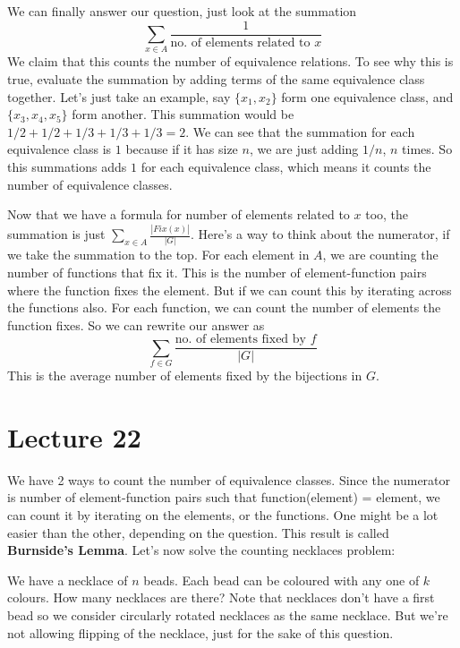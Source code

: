 \documentclass[a4paper,10pt]{article}
\theoremstyle{definition} %
\begin{document}
    We can finally answer our question, just look at the summation
    \[ \sum_{x \in A} \frac{1}{\text{no. of elements related to } x}\]
    We claim that this counts the number of equivalence relations. To see why this is true, evaluate the summation by adding terms of the same equivalence class together. Let's just take 
    an example, say $\{x_1, x_2\}$ form one equivalence class, and $\{x_3, x_4, x_5\}$ form another. This summation would be $1/2 + 1/2 + 1/3 + 1/3 + 1/3 = 2$. We can see that the summation 
    for each equivalence class is $1$ because if it has size $n$, we are just adding $1/n$, $n$ times. So this summations adds $1$ for each equivalence class, which means it counts the number
    of equivalence classes.

    Now that we have a formula for number of elements related to $x$ too, the summation is just $\sum_{x \in A} \frac{|Fix(x)|}{|G|}$. Here's a way to think about the numerator, if we take the 
    summation to the top. For each element in $A$, we are counting the number of functions that fix it. This is the number of element-function pairs where the function fixes the element. But if 
    we can count this by iterating across the functions also. For each function, we can count the number of elements the function fixes. So we can rewrite our answer as
    \[ \sum_{f \in G} \frac{\text{no. of elements fixed by }f}{|G|} \]
    This is the average number of elements fixed by the bijections in $G$.

    \section{Lecture 22}
    We have 2 ways to count the number of equivalence classes. Since the numerator is number of element-function pairs such that function(element) = element, we can count it by iterating on the
    elements, or the functions. One might be a lot easier than the other, depending on the question. This result is called \textbf{Burnside's Lemma}. Let's now solve the counting necklaces problem:

    We have a necklace of $n$ beads. Each bead can be coloured with any one of $k$ colours. How many necklaces are there? Note that necklaces don't have a first bead so we consider circularly rotated 
    necklaces as the same necklace. But we're not allowing flipping of the necklace, just for the sake of this question.
\end{document}
